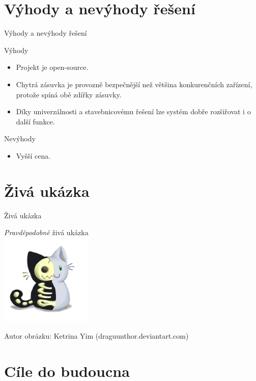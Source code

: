 \documentclass[11pt]{beamer}
\begin{document}
\section{Výhody a nevýhody řešení}

\begin{frame}{Výhody a nevýhody řešení}
  \begin{exampleblock}{Výhody}
    \begin{itemize}
      \item Projekt je open-source.
      \item Chytrá zásuvka je provozně bezpečnější než většina konkurenčních zařízení, protože spíná obě zdířky zásuvky.
      \item Díky univerzálnosti a stavebnicovému řešení lze systém dobře rozšiřovat i o další funkce.
    \end{itemize}
  \end{exampleblock}
  \begin{alertblock}{Nevýhody}
    \begin{itemize}
      \item Vyšší cena.
    \end{itemize}
  \end{alertblock}
\end{frame}

\section{Živá ukázka}
\begin{frame}{Živá ukázka}
  \begin{center}
    \huge{\textit{Pravděpodobně} živá ukázka} \\
    \vspace{8mm}
    \includegraphics[width = 0.33\textwidth]{../img/kocka.png}
    \vspace{8mm}
  \end{center}
  \small{Autor obrázku: Ketrina Yim (draguunthor.deviantart.com)}
\end{frame}

\section{Cíle do budoucna}
\end{document}
